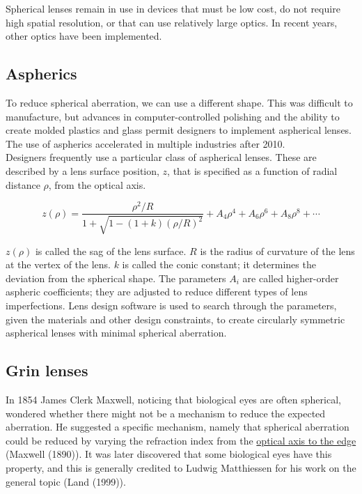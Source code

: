 \documentclass[
  letterpaper,
]{book}
\begin{document}
Spherical lenses remain in use in devices that must be low cost, do not
require high spatial resolution, or that can use relatively large
optics. In recent years, other optics have been implemented.

\subsection{Aspherics}\label{aspherics}

To reduce spherical aberration, we can use a different shape. This was
difficult to manufacture, but advances in computer-controlled polishing
and the ability to create molded plastics and glass permit designers to
implement aspherical lenses. The use of aspherics accelerated in
multiple industries after 2010.\\

Designers frequently use a particular class of aspherical lenses. These
are described by a lens surface position, \(z\), that is specified as a
function of radial distance \(\rho\), from the optical axis.

\begin{equation*}
z(\rho) = \frac{\rho^2 / R}{1 + \sqrt{1 - (1 + k)(\rho/R)^2}} + A_4 \rho^4 + A_6 \rho^6 + A_8 \rho^8 + \cdots
\end{equation*}

\(z(\rho)\) is called the sag of the lens surface. \(R\) is the radius
of curvature of the lens at the vertex of the lens. \(k\) is called the
conic constant; it determines the deviation from the spherical shape.
The parameters \(A_i\) are called higher-order aspheric coefficients;
they are adjusted to reduce different types of lens imperfections. Lens
design software is used to search through the parameters, given the
materials and other design constraints, to create circularly symmetric
aspherical lenses with minimal spherical aberration.

\subsection{Grin lenses}\label{grin-lenses}

In 1854 James Clerk Maxwell, noticing that biological eyes are often
spherical, wondered whether there might not be a mechanism to reduce the
expected aberration. He suggested a specific mechanism, namely that
spherical aberration could be reduced by varying the refraction index
from the
\href{https://archive.org/details/scientificpapers01maxw/page/76/mode/2up?view=theater}{optical
axis to the edge} (Maxwell (1890)). It was later discovered that some
biological eyes have this property, and this is generally credited to
Ludwig Matthiessen for his work on the general topic (Land (1999)).
\end{document}
